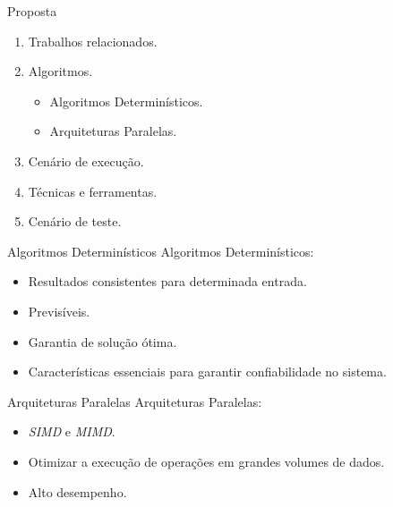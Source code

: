 \begin{frame}{Proposta}
    \begin{enumerate}
        \item Trabalhos relacionados.
        \item Algoritmos.
        \begin{itemize}
            \item Algoritmos Determinísticos.
            \item Arquiteturas Paralelas.
        \end{itemize}
        \item Cenário de execução.
        \item Técnicas e ferramentas.
        \item Cenário de teste.
    \end{enumerate}
\end{frame}

\begin{frame}{Algoritmos Determinísticos}
    Algoritmos Determinísticos:

    \begin{itemize}
        \item Resultados consistentes para determinada entrada.
        \item Previsíveis.
        \item Garantia de solução ótima.
        \item Características essenciais para garantir confiabilidade no sistema.
    \end{itemize}
\end{frame}

\begin{frame}{Arquiteturas Paralelas}
    Arquiteturas Paralelas:

    \begin{itemize}
        \item \textit{SIMD} e \textit{MIMD}.
        \item Otimizar a execução de operações em grandes volumes de dados.
        \item Alto desempenho.
    \end{itemize}
\end{frame}

